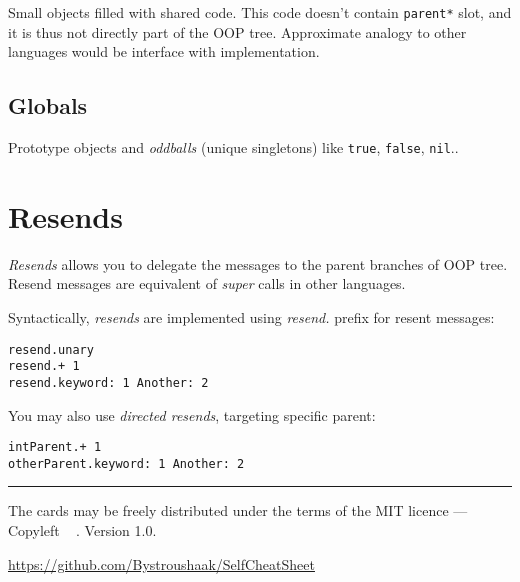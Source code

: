 \documentclass[10pt]{article}
\begin{document}
\begin{multicols*}{3}
Small objects filled with shared code. This code doesn't contain \texttt{parent*} slot, and it is thus not directly part of the OOP tree. Approximate analogy to other languages would be interface with implementation.



\subsection{Globals}
Prototype objects and \textit{oddballs} (unique singletons) like \texttt{true}, \texttt{false}, \texttt{nil}..


\section{Resends}

\textit{Resends} allows you to delegate the messages to the parent branches of OOP tree. Resend messages are equivalent of \textit{super} calls in other languages.

Syntactically, \textit{resends} are implemented using \textit{resend.} prefix for resent messages:

\begin{lstlisting}
resend.unary
resend.+ 1
resend.keyword: 1 Another: 2
\end{lstlisting}

You may also use \textit{directed resends}, targeting specific parent:

\begin{lstlisting}
intParent.+ 1
otherParent.keyword: 1 Another: 2
\end{lstlisting}












\vfill \hrule\smallskip

{\small
The cards may be freely distributed under
the terms of the MIT licence ---
Copyleft \textcopyleft\ \thedate{} \href{http://kitakitsune.org}{\theauthor}. Version 1.0.

\url{https://github.com/Bystroushaak/SelfCheatSheet}
}

\end{multicols*}
\end{document}
